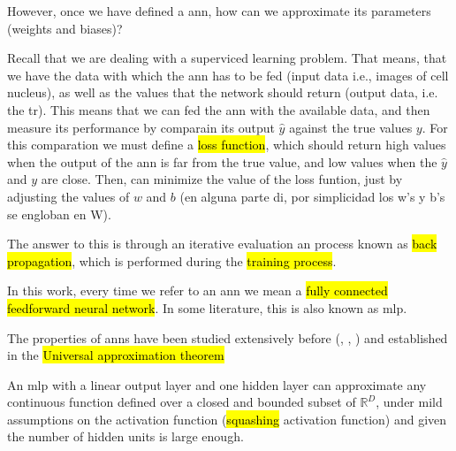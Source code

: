 However, once we have defined a \gls{ann}, how can we approximate its parameters (weights and biases)?

Recall that we are dealing with a superviced learning problem. That means, that we have the data with which the \gls{ann} has to be fed (input data i.e., images of cell nucleus), as well as the values that the network should return (output data, i.e. the \gls{tr}). This means that we can fed the \gls{ann} with the available data, and then measure its performance by comparain its output $\hat{y}$ against the true values $y$. For this comparation we must define a \hl{loss function}, which should return high values when the output of the \gls{ann} is far from the true value, and low values when the $\hat{y}$ and $y$ are close. Then, can minimize the value of the loss funtion, just by adjusting the values of $w$ and $b$ (en alguna parte di, por simplicidad los w's y b's se engloban en W).



The answer to this is through an iterative evaluation an  process known as \hl{back propagation}, which is performed during the \hl{training process}.


In this work, every time we refer to an \gls{ann} we mean a \hl{fully connected feedforward neural network}. In some literature, this is also known as \gls{mlp}.

The properties of \glspl{ann} have been studied extensively before (\cite{cybenko1989approximation}, \cite{hornik1989multilayer}, \cite{funahashi1989approximate}) and established in the \hl{Universal approximation theorem}

\begin{theorem}
  An \gls{mlp} with a linear output layer and one hidden layer can approximate any continuous function defined over a closed and bounded subset of $\mathbb{R}^D$, under mild assumptions on the activation function (\hl{squashing} activation function) and given the number of hidden units is large enough.
\end{theorem}

